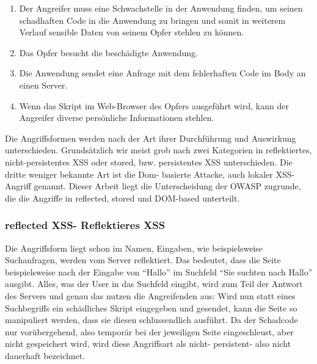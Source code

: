 \begin{enumerate}
	\item Der Angreifer muss eine Schwachstelle in der Anwendung finden, um seinen schadhaften Code in die Anwendung zu bringen und somit in weiterem Verlauf sensible Daten von seinem Opfer stehlen zu können.
	\item Das Opfer besucht die beschädigte Anwendung.
	\item Die Anwendung sendet eine Anfrage mit dem fehlerhaften
	Code im Body an einen Server.
	\item Wenn das Skript im Web-Browser des Opfers ausgeführt
	wird, kann der Angreifer diverse persönliche Informationen
	stehlen.
\end{enumerate}

Die Angriffsformen werden nach der Art ihrer Durchführung und Auswirkung unterschieden.  Grundsätzlich wir meist grob nach zwei Kategorien in reflektiertes, nicht-persistentes XSS oder stored, bzw. persistentes XSS unterschieden. Die dritte weniger bekannte Art ist die Dom- basierte Attacke, auch lokaler XSS- Angriff genannt. Dieser Arbeit liegt die Unterscheidung der OWASP zugrunde, die die Angriffe in reflected, stored und DOM-based unterteilt.

\subsubsection{reflected XSS- Reflektieres XSS}
\label{section:reflected_XSS}

Die Angriffsform liegt schon im Namen, Eingaben, wie beispielsweise Suchanfragen, werden vom Server reflektiert. Das bedeutet, dass die Seite beispielsweise nach der Eingabe von “Hallo” im Suchfeld “Sie suchten nach Hallo” ausgibt. Alles, was der User in das Suchfeld eingibt, wird zum Teil der Antwort des Servers und genau das nutzen die Angreifenden aus: Wird nun statt eines Suchbegriffs ein schädliches Skript eingegeben und gesendet, kann die Seite so manipuliert werden, dass sie diesen schlussendlich ausführt. Da der Schadcode nur vorübergehend, also temporär bei der jeweiligen Seite eingeschleust, aber nicht gespeichert wird, wird diese Angriffsart als nicht- persistent- also nicht dauerhaft bezeichnet.



